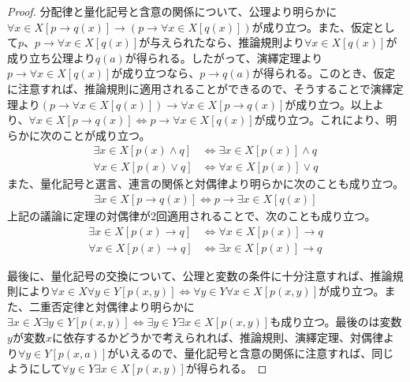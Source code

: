 \documentclass[a4paper]{jsarticle}
\begin{document}
\begin{proof}
分配律と量化記号と含意の関係について、公理より明らかに$\forall x \in X\left[ p \rightarrow q(x) \right] \rightarrow \left( p \rightarrow \forall x \in X\left[ q(x) \right] \right)$が成り立つ。また、仮定として$p$、$p \rightarrow \forall x \in X\left[ q(x) \right]$が与えられたなら、推論規則より$\forall x \in X\left[ q(x) \right]$が成り立ち公理より$q(a)$が得られる。したがって、演繹定理より$p \rightarrow \forall x \in X\left[ q(x) \right]$が成り立つなら、$p \rightarrow q(a)$が得られる。このとき、仮定に注意すれば、推論規則に適用されることができるので、そうすることで演繹定理より$\left( p \rightarrow \forall x \in X\left[ q(x) \right] \right) \rightarrow \forall x \in X\left[ p \rightarrow q(x) \right]$が成り立つ。以上より、$\forall x \in X\left[ p \rightarrow q(x) \right] \Leftrightarrow p \rightarrow \forall x \in X\left[ q(x) \right]$が成り立つ。これにより、明らかに次のことが成り立つ。
\begin{align*}
\exists x \in X\left[ p(x) \land q \right] &\Leftrightarrow \exists x \in X\left[ p(x) \right] \land q \\
\forall x \in X\left[ p(x) \vee q \right] &\Leftrightarrow \forall x \in X\left[ p(x) \right] \vee q 
\end{align*}
また、量化記号と選言、連言の関係と対偶律より明らかに次のことも成り立つ。
\begin{align*}
\exists x \in X\left[ p \rightarrow q(x) \right] \Leftrightarrow p \rightarrow \exists x \in X\left[ q(x) \right]
\end{align*}
上記の議論に定理の対偶律が2回適用されることで、次のことも成り立つ。
\begin{align*}
\exists x \in X\left[ p(x) \rightarrow q \right] &\Leftrightarrow \forall x \in X\left[ p(x) \right] \rightarrow q \\
\forall x \in X\left[ p(x) \rightarrow q \right] &\Leftrightarrow \exists x \in X\left[ p(x) \right] \rightarrow q
\end{align*}\par
最後に、量化記号の交換について、公理と変数の条件に十分注意すれば、推論規則により$\forall x \in X\forall y \in Y\left[ p(x,y) \right] \Leftrightarrow \forall y \in Y\forall x \in X\left[ p(x,y) \right]$が成り立つ。また、二重否定律と対偶律より明らかに$\exists x \in X\exists y \in Y\left[ p(x,y) \right] \Leftrightarrow \exists y \in Y\exists x \in X\left[ p(x,y) \right]$も成り立つ。最後のは変数$y$が変数$x$に依存するかどうかで考えられれば、推論規則、演繹定理、対偶律より$\forall y \in Y\left[ p(x,a) \right]$がいえるので、量化記号と含意の関係に注意すれば、同じようにして$\forall y \in Y\exists x \in X\left[ p(x,y) \right]$が得られる。
\end{proof}
\end{document}
